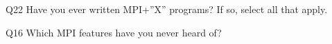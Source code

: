\begin{description}%
\item{Q22} Have you ever written MPI+”X” programs? If so, select all that apply.%
\item{Q16} Which MPI features have you never heard of?%
\end{description}%
